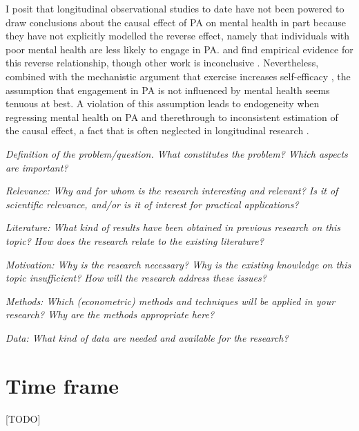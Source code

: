 \documentclass[a4paper,11pt]{report}
\begin{document}
I posit that longitudinal observational studies to date have not been powered to draw conclusions about the causal effect
of PA on mental health in part because they have not explicitly modelled the reverse effect, namely that individuals with poor
mental health are less likely to engage in PA.
 and  find empirical evidence for this reverse relationship,
though other work is inconclusive \cite{birkeland2009longitudinal, ku2012physical}. Nevertheless, combined with the
mechanistic argument that exercise increases self-efficacy \cite{smith2021role}, the assumption that engagement in PA is
not influenced by mental health seems tenuous at best.
A violation of this assumption leads to endogeneity when regressing mental health on PA and therethrough to
inconsistent estimation of the causal effect, a fact that is often neglected in longitudinal research \cite{leszczensky2022deal}.




\textit{Definition of the problem/question. What constitutes the problem? Which aspects are important?}

\textit{Relevance: Why and for whom is the research interesting and relevant? Is it of scientific relevance, and/or is it of interest for practical applications?}

\textit{Literature: What kind of results have been obtained in previous research on this topic? How does the research relate to the existing literature?}

\textit{Motivation: Why is the research necessary? Why is the existing knowledge on this topic insufficient? How will the research address these issues?}

\textit{Methods: Which (econometric) methods and techniques will be applied in your research? Why are the methods appropriate here?}

\textit{Data: What kind of data are needed and available for the research?}


\section*{Time frame}
[TODO]




\end{document}

